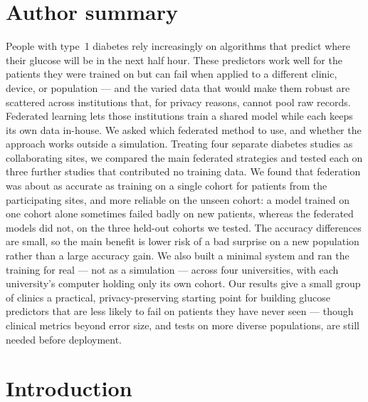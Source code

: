\documentclass[10pt,letterpaper]{article}
\begin{document}
\section*{Author summary}
People with type~1 diabetes rely increasingly on algorithms that predict where
their glucose will be in the next half hour. These predictors work well for the
patients they were trained on but can fail when applied to a different clinic,
device, or population --- and the varied data that would make them robust are
scattered across institutions that, for privacy reasons, cannot pool raw
records. Federated learning lets those institutions train a shared model while
each keeps its own data in-house. We asked which federated method to use, and
whether the approach works outside a simulation. Treating four separate
diabetes studies as collaborating sites, we compared the main federated
strategies and tested each on three further studies that contributed no training
data.
We found that federation was about as accurate as training on a single cohort
for patients from the participating sites, and more reliable on the unseen
cohort: a model trained on one cohort alone sometimes failed badly on new
patients, whereas the federated models did not, on the three held-out cohorts we
tested. The accuracy differences are
small, so the main benefit is lower risk of a bad surprise on a new population
rather than a large accuracy gain. We also built a minimal system and ran the
training for real --- not as a simulation --- across four universities, with each
university's computer holding only its own cohort. Our results
give a small group of clinics a practical, privacy-preserving starting point for
building glucose predictors that are less likely to fail on patients they have
never seen --- though clinical metrics beyond error size, and tests on more
diverse populations, are still needed before deployment.

\clearpage
{}
\linenumbers

\section*{Introduction}
\end{document}

